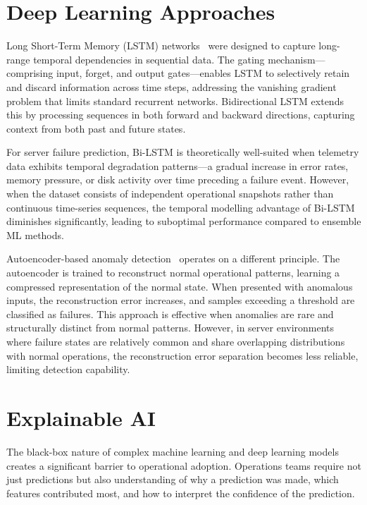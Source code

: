 \documentclass[12pt,letterpaper]{report}
\begin{document}
\section{Deep Learning Approaches}

Long Short-Term Memory (LSTM) networks~\cite{hochreiter1997} were designed to capture long-range temporal dependencies in sequential data. The gating mechanism---comprising input, forget, and output gates---enables LSTM to selectively retain and discard information across time steps, addressing the vanishing gradient problem that limits standard recurrent networks. Bidirectional LSTM extends this by processing sequences in both forward and backward directions, capturing context from both past and future states.

For server failure prediction, Bi-LSTM is theoretically well-suited when telemetry data exhibits temporal degradation patterns---a gradual increase in error rates, memory pressure, or disk activity over time preceding a failure event. However, when the dataset consists of independent operational snapshots rather than continuous time-series sequences, the temporal modelling advantage of Bi-LSTM diminishes significantly, leading to suboptimal performance compared to ensemble ML methods.

Autoencoder-based anomaly detection~\cite{goodfellow2016} operates on a different principle. The autoencoder is trained to reconstruct normal operational patterns, learning a compressed representation of the normal state. When presented with anomalous inputs, the reconstruction error increases, and samples exceeding a threshold are classified as failures. This approach is effective when anomalies are rare and structurally distinct from normal patterns. However, in server environments where failure states are relatively common and share overlapping distributions with normal operations, the reconstruction error separation becomes less reliable, limiting detection capability.

\section{Explainable AI}

The black-box nature of complex machine learning and deep learning models creates a significant barrier to operational adoption. Operations teams require not just predictions but also understanding of why a prediction was made, which features contributed most, and how to interpret the confidence of the prediction.
\end{document}
